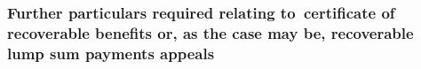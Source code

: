 \documentclass[12pt,a4paper]{article}
\begin{document}

\subsubsection[29. Further particulars required relating to~certificate of recoverable benefits 
or, as the case may be, recoverable lump sum payments  %
appeals%
]{Further particulars required relating to~certificate of recoverable benefits 
or, as the case may be, recoverable lump sum payments  %
appeals%
}
\end{document}
